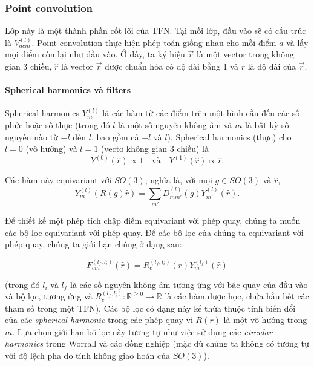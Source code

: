 
\subsubsection{Point convolution}
Lớp này là một thành phần cốt lõi của TFN. Tại mỗi lớp, đầu vào sẽ có cấu trúc là $V^{(l)}_{acm}$. Point convolution thực hiện phép toán giống nhau cho mỗi điểm $a$ và lấy mọi điểm còn lại như đầu vào. Ở đây, ta ký hiệu $\vec{r}$ là một vector trong không gian 3 chiều, $\hat{r}$ là vector $\vec{r}$ được chuẩn hóa có độ dài bằng 1 và $r$ là độ dài của $\vec{r}$. 

\paragraph{Spherical harmonics và filters}

Spherical harmonics $Y^{(l)}_m$ là các hàm từ các điểm trên một hình cầu đến các số phức hoặc số thực (trong đó $l$ là một số nguyên không âm và $m$ là bất kỳ số nguyên nào từ $-l$ đến $l$, bao gồm cả $-l$ và $l$). Spherical harmonics (thực) cho $l = 0$ (vô hướng) và $l = 1$ (vectơ không gian 3 chiều) là 
$$
Y^{(0)}(\hat{r}) \propto 1  \quad \text{và} \quad  Y^{(1)}(\hat{r}) \propto \hat{r}.
$$

Các hàm này equivariant với $SO(3)$; nghĩa là, với mọi $g \in SO(3)$ và $\hat{r}$, 
$$
Y^{(l)}_m (R(g) \hat{r}) = \sum_{m'} D^{(l)}_{mm'}(g) Y^{(l)}_{m'}(\hat{r}).
$$

Để thiết kế một phép tích chập điểm equivariant với phép quay, chúng ta muốn các bộ lọc equivariant với phép quay. Để các bộ lọc của chúng ta equivariant với phép quay, chúng ta giới hạn chúng ở dạng sau\cite{thomas2018tensorfieldnetworksrotation}:

\begin{equation}\label{eq:2}
F^{(l_f, l_i)}_{cm}(\hat{r}) = R^{(l_f, l_i)}_c (r) Y^{(l_f)}_m (\hat{r})  
\end{equation}

(trong đó $l_i$ và $l_f$ là các số nguyên không âm tương ứng với bậc quay của đầu vào và bộ lọc, tương ứng và $R^{(l_f, l_i)}_c : \mathbb{R}^{\ge 0} \rightarrow \mathbb{R}$ là các hàm được học, chứa hầu hết các tham số trong một TFN). Các bộ lọc có dạng này kế thừa thuộc tính biến đổi của các \textit{spherical harmonic} trong các phép quay vì $R(r)$ là một vô hướng trong $m$. Lựa chọn giới hạn bộ lọc này tương tự như việc sử dụng các \textit{circular harmonics} trong Worrall và các đồng nghiệp\cite{worrall2017harmonicnetworksdeeptranslation} (mặc dù chúng ta không có tương tự với độ lệch pha do tính không giao hoán của $SO(3)$). 

